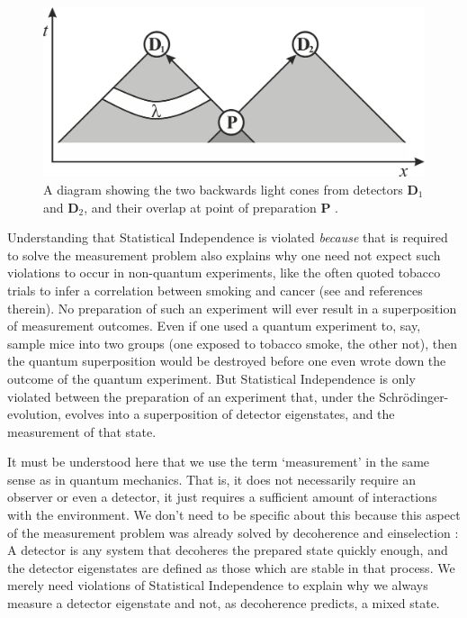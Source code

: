 \documentclass[superscriptaddress,twocolumn,floatfix,nofootinbib]{revtex4-2}
\begin{document}
\begin{figure}
    \centering
    \includegraphics[width=\linewidth]{bellsi.png}
    \caption{A diagram showing the two backwards light cones from detectors {\bf D}$_1$ and {\bf D}$_2$, and their overlap at point of preparation \textbf{P
    }.}
    \label{fig:locality}
\end{figure}

Understanding that Statistical Independence is violated \emph{because} that is required to solve the measurement problem also explains why one need not expect such violations to occur in non-quantum experiments, like the often quoted tobacco trials to infer a correlation between smoking and cancer (see \cite{Hossenfelder2020Rethinking} and references therein). No preparation of such an experiment will ever result in a superposition of measurement outcomes. Even if one used a quantum experiment to, say, sample mice into two groups (one exposed to tobacco smoke, the other not), then the quantum superposition would be destroyed before one even wrote down the outcome of the quantum experiment. But Statistical Independence is only violated between the preparation of an experiment that, under the Schr\"odinger-evolution, evolves into a superposition of detector eigenstates, and the measurement of that state. 

It must be understood here that we use the term `measurement' in the same sense as in quantum mechanics. That is, it does not necessarily require an observer or even a detector, it just requires a sufficient amount of interactions with the environment. We don't need to be specific about this because this aspect of the measurement problem was already solved by decoherence and einselection \cite{Zurek2003Decoherence}: A detector is any system that decoheres the prepared state quickly enough, and the detector eigenstates are defined as those which are stable in that process. We merely need violations of Statistical Independence to explain why we always measure a detector eigenstate and not, as decoherence predicts, a mixed state. 
\end{document}
